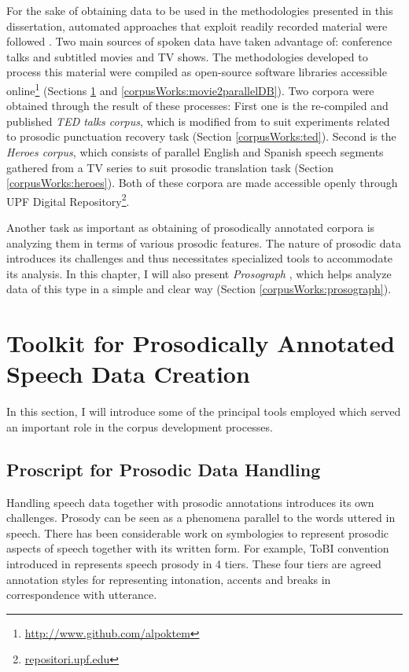 For the sake of obtaining data to be used in the methodologies presented in this dissertation, automated approaches that exploit readily recorded material were followed \citep{bucc, Oktem2018}. Two main sources of spoken data have taken advantage of: conference talks and subtitled movies and TV shows. The methodologies developed to process this material were compiled as open-source software libraries accessible online\footnote{\url{http://www.github.com/alpoktem}} (Sections \ref{corpusWorks:toolkit} and \ref{corpusWorks:movie2parallelDB}). Two corpora were obtained through the result of these processes: First one is the re-compiled and published \textit{TED talks corpus}, which is modified from \cite{Farrus:SP:2016} to suit experiments related to prosodic punctuation recovery task (Section \ref{corpusWorks:ted}). Second is the \textit{Heroes corpus}, which consists of parallel English and Spanish speech segments gathered from a TV series to suit prosodic translation task (Section \ref{corpusWorks:heroes}). Both of these corpora are made accessible openly through UPF Digital Repository\footnote{\url{repositori.upf.edu}}. 

Another task as important as obtaining of prosodically annotated corpora is analyzing them in terms of various prosodic features. The nature of prosodic data introduces its challenges and thus necessitates specialized tools to accommodate its analysis. In this chapter, I will also present \textit{Prosograph} \citep{prosograph}, which helps analyze data of this type in a simple and clear way (Section \ref{corpusWorks:prosograph}). 

\section{Toolkit for Prosodically Annotated Speech Data Creation}
\label{corpusWorks:toolkit}

In this section, I will introduce some of the principal tools employed which served an important role in the corpus development processes. 

\subsection*{Proscript for Prosodic Data Handling}
Handling speech data together with prosodic annotations introduces its own challenges. Prosody can be seen as a phenomena parallel to the words uttered in speech. There has been considerable work on symbologies to represent prosodic aspects of speech together with its written form. For example, ToBI convention introduced in \cite{tobi} represents speech prosody in 4 tiers. These four tiers are agreed annotation styles for representing intonation, accents and breaks in correspondence with utterance. 

